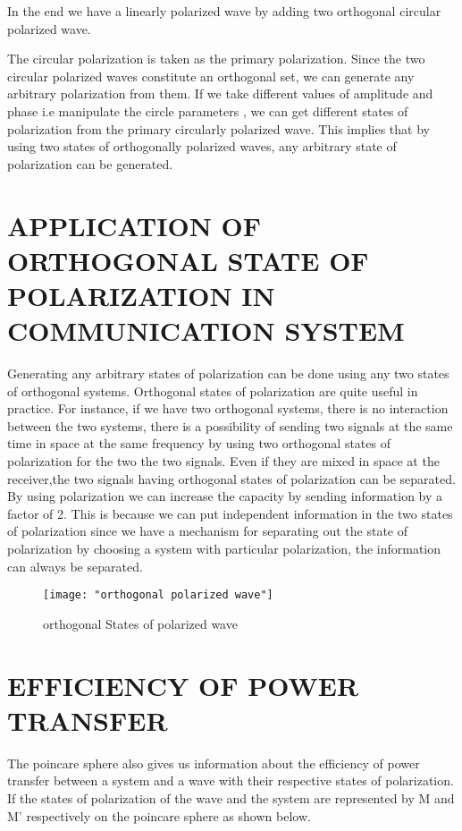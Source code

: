 	In the end we have a linearly polarized wave by adding two orthogonal circular polarized wave.
	
	The circular polarization is taken as the primary polarization. Since the two circular polarized waves constitute an orthogonal set, we can generate any arbitrary polarization from them. If we take different values of amplitude and phase i.e manipulate the circle parameters , we can get different states of polarization from the primary circularly polarized wave. This implies that by using two states of orthogonally polarized waves, any arbitrary state of polarization can be generated.
	
	
	\section{APPLICATION OF ORTHOGONAL STATE OF POLARIZATION IN COMMUNICATION SYSTEM}	
	Generating any arbitrary states of polarization can be done using any two states of orthogonal systems. Orthogonal states of polarization are quite useful in practice. For instance, if we have two orthogonal systems, there is no interaction between the two systems, there is a possibility of sending two signals at the same time in space at the same frequency by using two orthogonal states of polarization for the two the two signals. Even if they are mixed in space at the receiver,the two signals having orthogonal states of polarization can be separated. By using polarization we can increase the capacity by sending information by a factor of 2. This is because we can put independent information in the two states of polarization since we have a mechanism for separating out the state of polarization by choosing a system with particular polarization, the information can always be separated.	
	\begin{figure}[h]
		\centering
		\texttt{[image: "orthogonal polarized wave"]}
		\caption{orthogonal States of polarized wave}
		\label{fig:orthogonal-polarized-wave}
	\end{figure}
	\newpage
	\section{EFFICIENCY OF POWER TRANSFER}
	
	The poincare sphere also gives us information about the efficiency of power transfer between a system and a wave with their respective states of polarization. If the states of polarization of the wave and the system are represented by M and M' respectively on the poincare sphere as shown below.\\
	
